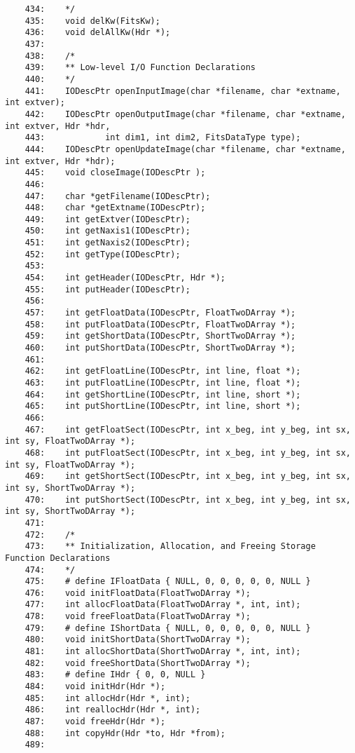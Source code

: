 \begin{scriptsize}
\begin{verbatim}
    434:    */
    435:    void delKw(FitsKw);
    436:    void delAllKw(Hdr *);
    437:    
    438:    /* 
    439:    ** Low-level I/O Function Declarations
    440:    */
    441:    IODescPtr openInputImage(char *filename, char *extname, int extver);
    442:    IODescPtr openOutputImage(char *filename, char *extname, int extver, Hdr *hdr,
    443:            int dim1, int dim2, FitsDataType type);
    444:    IODescPtr openUpdateImage(char *filename, char *extname, int extver, Hdr *hdr);
    445:    void closeImage(IODescPtr );
    446:    
    447:    char *getFilename(IODescPtr);
    448:    char *getExtname(IODescPtr);
    449:    int getExtver(IODescPtr);
    450:    int getNaxis1(IODescPtr);
    451:    int getNaxis2(IODescPtr);
    452:    int getType(IODescPtr);
    453:    
    454:    int getHeader(IODescPtr, Hdr *);
    455:    int putHeader(IODescPtr);
    456:    
    457:    int getFloatData(IODescPtr, FloatTwoDArray *);
    458:    int putFloatData(IODescPtr, FloatTwoDArray *);
    459:    int getShortData(IODescPtr, ShortTwoDArray *);
    460:    int putShortData(IODescPtr, ShortTwoDArray *);
    461:    
    462:    int getFloatLine(IODescPtr, int line, float *);
    463:    int putFloatLine(IODescPtr, int line, float *);
    464:    int getShortLine(IODescPtr, int line, short *);
    465:    int putShortLine(IODescPtr, int line, short *);
    466:    
    467:    int getFloatSect(IODescPtr, int x_beg, int y_beg, int sx, int sy, FloatTwoDArray *);
    468:    int putFloatSect(IODescPtr, int x_beg, int y_beg, int sx, int sy, FloatTwoDArray *);
    469:    int getShortSect(IODescPtr, int x_beg, int y_beg, int sx, int sy, ShortTwoDArray *);
    470:    int putShortSect(IODescPtr, int x_beg, int y_beg, int sx, int sy, ShortTwoDArray *);
    471:    
    472:    /*
    473:    ** Initialization, Allocation, and Freeing Storage Function Declarations
    474:    */
    475:    # define IFloatData { NULL, 0, 0, 0, 0, 0, NULL }
    476:    void initFloatData(FloatTwoDArray *);
    477:    int allocFloatData(FloatTwoDArray *, int, int);
    478:    void freeFloatData(FloatTwoDArray *);
    479:    # define IShortData { NULL, 0, 0, 0, 0, 0, NULL }
    480:    void initShortData(ShortTwoDArray *);
    481:    int allocShortData(ShortTwoDArray *, int, int);
    482:    void freeShortData(ShortTwoDArray *);
    483:    # define IHdr { 0, 0, NULL }
    484:    void initHdr(Hdr *);
    485:    int allocHdr(Hdr *, int);
    486:    int reallocHdr(Hdr *, int);
    487:    void freeHdr(Hdr *);
    488:    int copyHdr(Hdr *to, Hdr *from);
    489:    

\end{verbatim}
\end{scriptsize}
